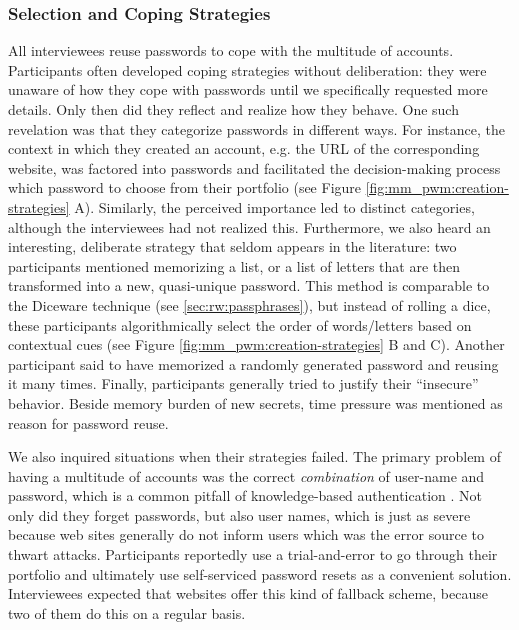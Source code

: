\subsubsection{Selection and Coping Strategies}
All interviewees reuse passwords to cope with the multitude of accounts. Participants often developed coping strategies without deliberation: they were unaware of how they cope with passwords until we specifically requested more details. Only then did they reflect and realize how they behave. One such revelation was that they categorize passwords in different ways. For instance, the context in which they created an account, e.g. the URL of the corresponding website, was factored into passwords and facilitated the decision-making process which password to choose from their portfolio (see Figure \ref{fig:mm_pwm:creation-strategies} A). Similarly, the perceived importance led to distinct categories, although the interviewees had not realized this. Furthermore, we also heard an interesting, deliberate strategy that seldom appears in the literature: two participants mentioned memorizing a list, or a list of letters that are then transformed into a new, quasi-unique password. This method is comparable to the Diceware technique (see \ref{sec:rw:passphrases}), but instead of rolling a dice, these participants algorithmically select the order of words/letters based on contextual cues (see Figure \ref{fig:mm_pwm:creation-strategies} B and C). Another participant said to have memorized a randomly generated password and reusing it many times. Finally, participants generally tried to justify their ``insecure'' behavior. Beside memory burden of new secrets, time pressure was mentioned as reason for password reuse. 

We also inquired situations when their strategies failed. The primary problem of having a multitude of accounts was the correct \textit{combination} of user-name and password, which is a common pitfall of knowledge-based authentication \cite{Stobert2014PasswordLifeCycle}. Not only did they forget passwords, but also user names, which is just as severe because web sites generally do not inform users which was the error source to thwart attacks. Participants reportedly use a trial-and-error to go through their portfolio and ultimately use self-serviced password resets as a convenient solution. Interviewees expected that websites offer this kind of fallback scheme, because two of them do this on a regular basis. 

